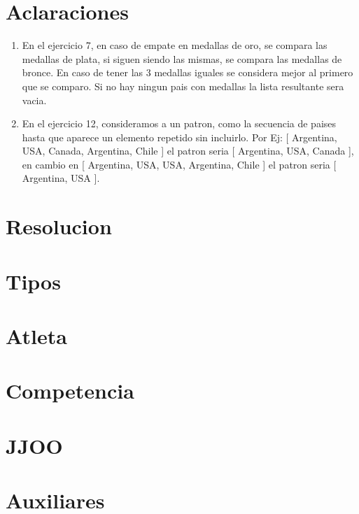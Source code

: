 \documentclass[10pt,titlepage,a4paper]{article}
\begin{document}
\maketitle

\newpage

\section{Aclaraciones}

\begin{enumerate}
\item
En el ejercicio 7, en caso de empate en medallas de oro, se compara las medallas de plata, si siguen siendo las mismas, se compara las medallas de bronce. En caso de tener las 3 medallas iguales se considera mejor al primero que se comparo.
Si no hay ningun pais con medallas la lista resultante sera vacia.

\item
En el ejercicio 12, consideramos a un patron, como la secuencia de paises hasta que aparece un elemento repetido sin incluirlo. Por Ej: [ Argentina, USA, Canada, Argentina, Chile ] el patron seria [ Argentina, USA, Canada ], en cambio en [ Argentina, USA, USA, Argentina, Chile ] el patron seria [ Argentina, USA ].
\end{enumerate}

\section{Resolucion}

\begin{enumerate}






\end{enumerate}

\newpage

\section{Tipos}



\section{Atleta}


\section{Competencia}



\section{JJOO}


\section{Auxiliares}


\end{document}

